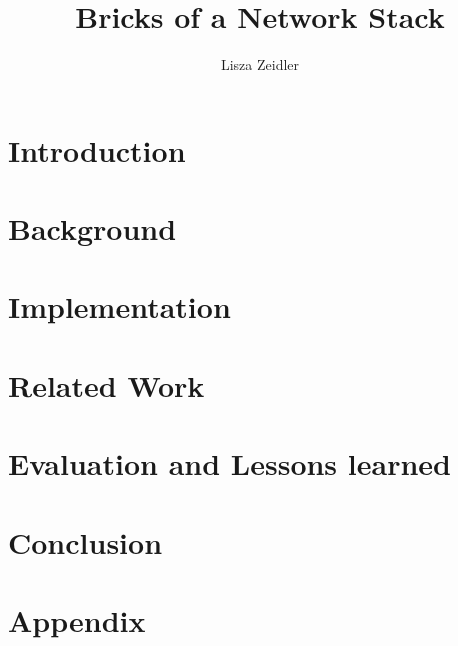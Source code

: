 \documentclass[diplominf, bibnum, lof, lot]{zihpub}
\author{Lisza Zeidler}
\title{Bricks of a Network Stack}
\begin{document}
\begin{thesisdocument}


\chapter{Introduction}
\label{Chapter:Intro}


\chapter{Background}
\label{Chapter:Background}


\chapter{Implementation}
\label{Chapter:Implementation}


\chapter{Related Work}
\label{Chapter:Related}


\chapter{Evaluation and Lessons learned}
\label{Chapter:Learnings}


\chapter{Conclusion}
\label{Chapter:Discussion}


\appendix
\chapter{Appendix}
\label{Appendix}


\end{thesisdocument}
\end{document}
